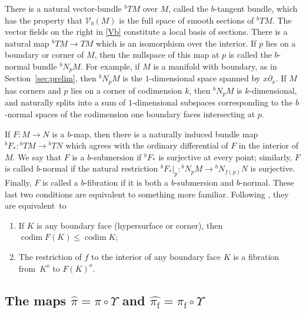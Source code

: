 \documentclass[JEP,XML,SOM,Unicode,NoFloatCountersInSection, NoEqCountersInSection,published]{cedram}
\newenvironment{enumeratea}
{\bgroup\def\theenumi{\alph{enumi}}\begin{enumerate}}
{\end{enumerate}\egroup}
\DeclareMathOperator{\codim}{codim}
\theoremstyle{plain}
\theoremstyle{definition}
\theoremstyle{remark}
\newcommand{\hpi}{\widehat{\pi}}
\newcommand{\del}{\partial}
\newcommand{\foot}{{\pi_{\mathrm f}}}
\newcommand{\hF}{\widehat{\foot}}
\begin{document}
There is a natural vector-bundle ${}^b TM$ over $M$, called the $b$-tangent bundle, which has the property that
$\mathcal V_b(M)$ is the full space of smooth sections of ${}^b TM$. The vector fields on the right in \eqref{Vb} constitute a local basis of sections. There is a natural map ${}^b TM \to TM$ which is an isomorphism over the interior. If $p$ lies on a boundary or corner of $M$, then the nullspace of this map at $p$ is called the $b$-normal bundle ${}^b N_p M$. For example, if $M$ is a manifold with boundary, as in Section~\ref{sec:prelim}, then ${}^bN_p M$ is the $1$-dimensional space spanned by $x\del_x$. If $M$ has corners and $p$ lies on a corner of codimension $k$, then ${}^bN_p M$ is $k$-dimensional, and naturally splits into a sum of $1$\nobreakdash-dimensional subspaces corresponding to the $b$-normal spaces of the codimension one boundary faces intersecting at $p$.

If $F:M \to N$ is a $b$-map, then there is a naturally induced bundle map ${}^bF_*: {}^bTM \to {}^bTN$ which agrees with the ordinary differential of $F$ in the interior of $M$. We say that $F$ is a $b$-submersion if ${}^b F_*$ is surjective at every point; similarly, $F$ is called $b$-normal if the natural restriction ${}^bF_*|_p: {}^bN_p M \to {}^bN_{f(p)} N$ is surjective. Finally, $F$ is called a $b$-fibration if it is both a $b$-submersion and $b$-normal.
These last two conditions are equivalent to something more familiar. Following \cite[Def.\,3.9]{Grieser2001}, they are
equivalent~to
\begin{enumeratea}
\item
If $K$ is any boundary face (\ie hypersurface or corner), then $\codim  F(K) \le \codim  K$;
\item
The restriction of $f$ to the interior of any boundary face $K$ is a fibration from~$K^o$ to $F(K)^o$.
\end{enumeratea}

\subsection{The maps $\hpi = \pi\circ\Upsilon$ and $\hF = \foot\circ\Upsilon$} \label{ssec:doubleb}
\end{document}
